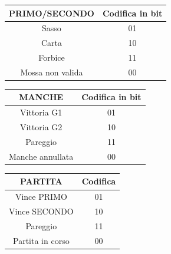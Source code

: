 \documentclass[a4paper]{report}
\begin{document}
\begin{figure}[h]
  \centering
  \begin{minipage}[t]{0.45\linewidth}
    \centering
    \renewcommand{\arraystretch}{1.4}
    \begin{tabular}{|c|c|}
        \hline
        \textbf{PRIMO/SECONDO} & \textbf{Codifica in bit} \\
        \hline
        Sasso & 01 \\
        \hline
        Carta & 10 \\
        \hline
        Forbice & 11 \\
        \hline
        Mossa non valida & 00 \\
        \hline
    \end{tabular}
    \label{tab:mosse}
  \end{minipage}
  \begin{minipage}[t]{0.45\linewidth}
    \centering
    \renewcommand{\arraystretch}{1.4}
    \begin{tabular}{|c|c|}
        \hline
        \textbf{MANCHE} & \textbf{Codifica in bit} \\
        \hline
        Vittoria G1 & 01 \\
        \hline
        Vittoria G2 & 10 \\
        \hline
        Pareggio & 11 \\
        \hline
        Manche annullata & 00 \\
        \hline
    \end{tabular}
    \label{tab:manche}
  \end{minipage}

  \vspace{10pt}

  \begin{minipage}[t]{0.5\linewidth}
    \centering
    \renewcommand{\arraystretch}{1.4}
    \begin{tabular}{|c|c|}
      \hline
      \textbf{PARTITA} & \textbf{Codifica} \\
      \hline
      Vince PRIMO & 01 \\
      \hline
      Vince SECONDO & 10 \\
      \hline
      Pareggio & 11 \\
      \hline
      Partita in corso & 00 \\
      \hline
    \end{tabular}
    \label{tab:partita}
  \end{minipage}
\end{figure}
\end{document}

